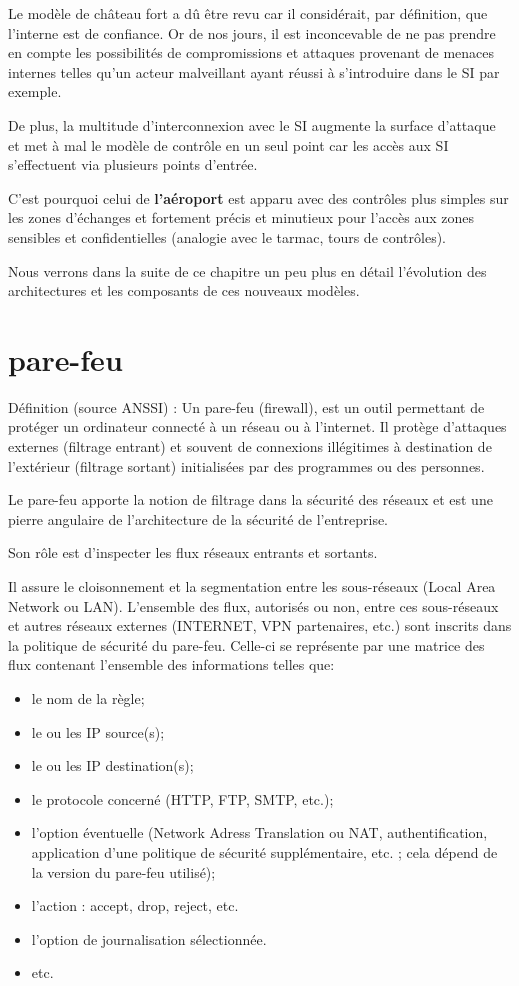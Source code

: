 
Le modèle de château fort a dû être revu car il considérait, par définition, que l'interne est de confiance. Or de nos jours, il est inconcevable de ne pas prendre en compte les possibilités de compromissions et attaques provenant de menaces internes telles qu'un acteur malveillant ayant réussi à s'introduire dans le SI par exemple.

De plus, la multitude d'interconnexion avec le SI augmente la surface d'attaque et met à mal le modèle de contrôle en un seul point car les accès aux SI s'effectuent via plusieurs points d'entrée.

C'est pourquoi celui de \textbf{l'aéroport} est apparu avec des contrôles plus simples sur les zones d'échanges et fortement précis et minutieux pour l'accès aux zones sensibles et confidentielles (analogie avec le tarmac, tours de contrôles).

Nous verrons dans la suite de ce chapitre un peu plus en détail l'évolution des architectures et les composants de ces nouveaux modèles.

\section{pare-feu}
Définition (source ANSSI) :
Un pare-feu (firewall), est un outil permettant de protéger un ordinateur connecté à un réseau ou à l’internet. Il protège d’attaques externes (filtrage entrant) et souvent de connexions illégitimes à destination de l’extérieur (filtrage sortant) initialisées par des programmes ou des personnes.

Le pare-feu apporte la notion de filtrage dans la sécurité des réseaux et est une pierre angulaire de l'architecture de la sécurité de l'entreprise.

Son rôle est d'inspecter les flux réseaux entrants et sortants.

Il assure le cloisonnement et la segmentation entre les sous-réseaux (Local Area Network ou LAN).
L'ensemble des flux, autorisés ou non, entre ces sous-réseaux et autres réseaux externes (INTERNET, VPN partenaires, etc.) sont inscrits dans la politique de sécurité du pare-feu.
Celle-ci se représente par une matrice des flux contenant l'ensemble des informations telles que:
\begin{itemize}
    \item le nom de la règle;
    \item le ou les IP source(s);
    \item le ou les IP destination(s);
    \item le protocole concerné (HTTP, FTP, SMTP, etc.);
    \item l'option éventuelle (Network Adress Translation ou NAT, authentification, application d'une politique de sécurité supplémentaire, etc. ; cela dépend de la version du pare-feu utilisé);
    \item l'action : accept, drop, reject, etc.
    \item l'option de journalisation sélectionnée.
    \item etc.
\end{itemize}

